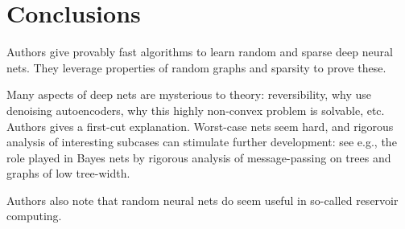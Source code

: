 \documentclass[11pt]{article}
\begin{document}
	
	\section{Conclusions}
	Authors give provably fast algorithms to learn random and sparse deep neural nets. They leverage properties of random graphs and sparsity to prove these. 
	
	Many aspects of deep nets are mysterious to theory: reversibility, why use denoising autoencoders, why this highly non-convex problem is solvable, etc. Authors gives a first-cut explanation.
	Worst-case nets seem hard, and rigorous analysis of interesting subcases can stimulate further development: see e.g., the role played in Bayes nets by rigorous analysis of message-passing on trees and graphs of low tree-width. 
	
	Authors also note that random neural nets do seem useful in so-called reservoir computing.	
\end{document}
